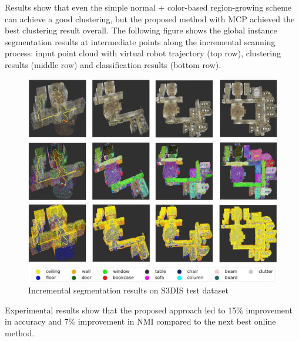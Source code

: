 Results show that even the simple normal + color-based region-growing
scheme can achieve a good clustering, but the proposed method with MCP
achieved the best clustering result overall. The following figure shows
the global instance segmentation results at intermediate points along
the incremental scanning process: input point cloud with virtual robot
trajectory (top row), clustering results (middle row) and classification
results (bottom row).

\begin{figure}[h!]
\centering
\includegraphics[width=0.7\linewidth]{images/incremseg.png}
\caption{Incremental segmentation results on S3DIS test dataset}
\end{figure}

Experimental results show that the proposed approach led to 15\%
improvement in accuracy and 7\% improvement in NMI compared to the next
best online method.